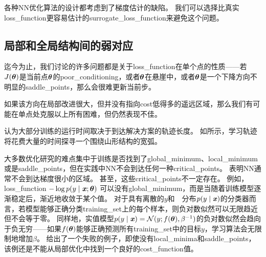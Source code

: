 
各种\gls{NN}优化算法的设计都考虑到了梯度估计的缺陷。
我们可以选择比真实\gls{loss_function}更容易估计的\gls{surrogate_loss_function}来避免这个问题。


\subsection{局部和全局结构间的弱对应}
\label{sec:poor_correspondence_between_local_and_global_structure}
迄今为止，我们讨论的许多问题都是关于\gls{loss_function}在单个点的性质——若$J(\boldsymbol{\theta})$是当前点$\boldsymbol{\theta}$的\gls{poor_conditioning}，或者$\boldsymbol{\theta}$在悬崖中，或者$\boldsymbol{\theta}$是一个下降方向不明显的\gls{saddle_points}，那么会很难更新当前步。


如果该方向在局部改进很大，但并没有指向\gls{cost}低得多的遥远区域，那么我们有可能在单点处克服以上所有困难，但仍然表现不佳。


\cite{GoodfellowOptimization15}认为大部分训练的运行时间取决于到达解决方案的轨迹长度。 
如所示，学习轨迹将花费大量的时间探寻一个围绕山形结构的宽弧。


大多数优化研究的难点集中于训练是否找到了\gls{global_minimum}、\gls{local_minimum}或是\gls{saddle_points}，但在实践中\gls{NN}不会到达任何一种\gls{critical_points}。
表明\gls{NN}通常不会到达梯度很小的区域。
甚至，这些\gls{critical_points}不一定存在。
例如，\gls{loss_function} $-\log p(y\mid\boldsymbol{\mathit{x}};\boldsymbol{\theta})$ 可以没有\gls{global_minimum}，而是当随着训练模型逐渐稳定后，渐近地收敛于某个值。    
对于具有离散的$y$和~~分布$p(y\mid\boldsymbol{\mathit{x}})$的分类器而言，若模型能够正确分类\gls{training_set}上的每个样本，则负对数似然可以无限趋近但不会等于零。
同样地，实值模型$p(y\mid\boldsymbol{\mathit{x}}) = \mathcal{N}(y;f(\boldsymbol{\theta}),\beta^{-1})$的负对数似然会趋向于负无穷——如果$f(\boldsymbol{\theta})$能够正确预测所有\gls{training_set}中的目标$y$，学习算法会无限制地增加$\beta$。
给出了一个失败的例子，即使没有\gls{local_minima}和\gls{saddle_points}，该例还是不能从局部优化中找到一个良好的\gls{cost_function}值。




